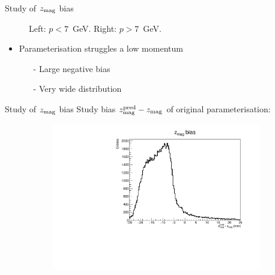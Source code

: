 \documentclass[xcolor={dvipsnames}]{beamer}
\begin{document}
\begin{frame}{Study of $z_{\rm mag}$ bias}
\begin{figure}[htb]
\begin{subfigure}{0.50\textwidth}
    \end{subfigure}
    \vspace{-0.2cm}
    \caption*{Left: $p < 7$~GeV. Right: $p > 7$~GeV.}
  \end{figure}
  \vspace{-0.5cm}
  \begin{itemize}
    \item{Parameterisation struggles a low momentum}
    \begin{itemize}
      \item[-]{Large negative bias}
      \item[-]{Very wide distribution}
    \end{itemize}
  \end{itemize}
\end{frame}

\begin{frame}{Study of $z_{\rm mag}$ bias}
  \vspace{0.0cm}
  {\Large Study bias $z_{\rm mag}^{\rm pred} - z_{\rm mag}$ of original parameterisation:}
  \begin{figure}[htb]
    \centering
    \begin{subfigure}{0.50\textwidth}
      \includegraphics[width=1\textwidth]{Plots/z_mag_position_bias_old_parameterisation_low_p.pdf}
    \end{subfigure}%
    \begin{subfigure}{0.50\textwidth}

\end{subfigure}
\end{figure}
\end{frame}
\end{document}

